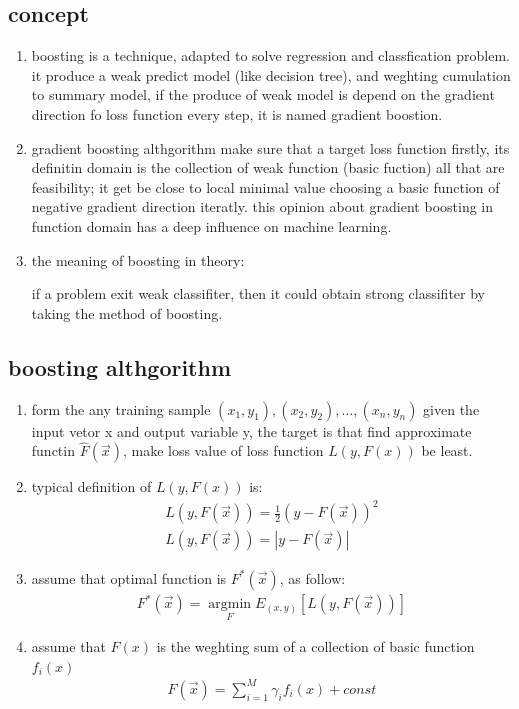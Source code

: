 \documentclass[12pt]{ctexart}%
\begin{document}
		\subsection{\quad concept}
			\begin{enumerate}
				\item boosting is a technique, adapted to solve regression and classfication problem. it produce a weak predict model (like decision tree), and weghting cumulation to summary model, if the produce of weak model is depend on the gradient direction fo loss function every step, it is named gradient boostion.
				
				\item gradient boosting althgorithm make sure that a target loss function firstly, its definitin domain is the collection of weak function (basic fuction) all that are feasibility; it get be close to local minimal value choosing a basic function of negative gradient direction iteratly. this opinion about gradient boosting in function domain has a deep influence on machine learning.
				
				\item the meaning of boosting in theory:
				
				\qquad \qquad if a problem exit weak classifiter, then it could obtain strong classifiter by taking the method of boosting.
			\end{enumerate}
		
		\subsection{\quad boosting althgorithm}
			\begin{enumerate}
				\item form the any training sample $(x_1, y_1), (x_2, y_2), ..., (x_n, y_n)$ given the input vetor x and output variable y, the target is that find approximate functin $\hat{F}(\vec{x})$, make loss value of loss function $L(y, F(x))$ be least.
				
				\item typical definition of $L(y, F(x))$ is:
					\begin{align}
						L(y, F(\vec{x})) = \frac{1}{2}(y-F(\vec{x}))^2\\
						L(y, F(\vec{x})) = |y- F(\vec{x})|
					\end{align}
					
				\item assume that optimal function is $F^*(\vec{x})$, as follow:
					\begin{align}
						F^*(\vec{x}) =\mathop{\arg \min}\limits_F E_{(x,y)} \left[ L(y, F(\vec{x}))\right]
					\end{align}
					
				\item assume that $F(x)$ is the weghting sum of a collection of basic function $f_i(x)$
					\begin{align}
						F(\vec{x}) = \sum_{i=1}^{M}\gamma_i f_i(x) + const
					\end{align}
			\end{enumerate}
		
\end{document}

